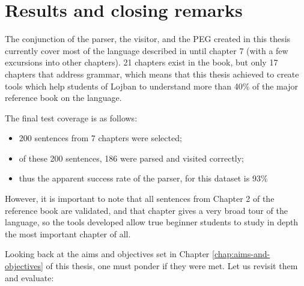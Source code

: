 \chapter{Results and closing remarks}

\vspace{0.5cm}

The conjunction of the parser, the visitor, and the PEG created in this thesis currently cover most of the language described in
 until chapter 7 (with a few excursions into other chapters). 21 chapters exist in the book,
but only 17 chapters that address grammar, which means that this thesis achieved to create tools which help students of
Lojban to understand more than 40\% of the major reference book on the language. \newline

The final test coverage is as follows:

\begin{itemize}
    \item 200 sentences from 7 chapters were selected;
    \item of these 200 sentences, 186 were parsed and visited correctly;
    \item thus the apparent success rate of the parser, for this dataset is 93\%
\end{itemize}

However, it is important to note that all sentences from Chapter 2 of the reference book are validated, and that chapter
gives a very broad tour of the language, so the tools developed allow true beginner students to study in depth the most
important chapter of all.\newline

Looking back at the aims and objectives set in Chapter \ref{chap:aims-and-objectives} of this thesis, one must ponder if
they were met. Let us revisit them and evaluate:

